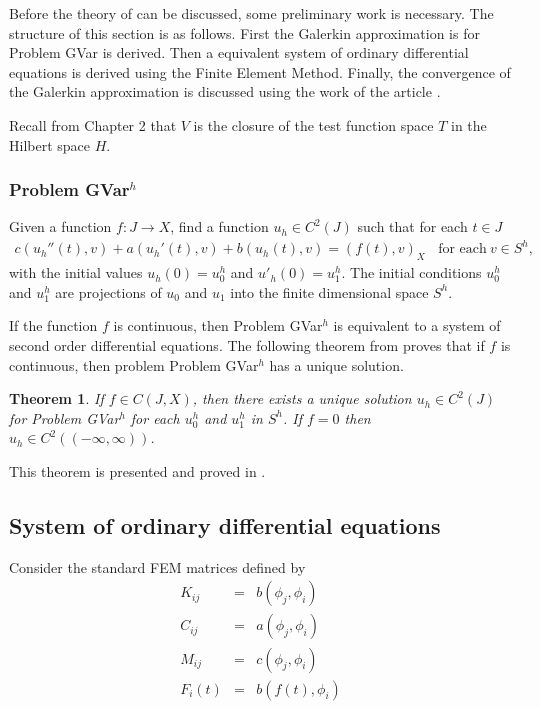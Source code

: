 \documentclass[../../main.tex]{subfiles}
\begin{document}
Before the theory of \cite{BV13} can be discussed, some preliminary work is
necessary. The structure of this section is as follows. First the Galerkin
approximation is for Problem GVar is derived. Then a equivalent system of
ordinary differential equations is derived using the Finite Element Method.
Finally, the convergence of the Galerkin approximation is discussed using the
work of the article \cite{BV13}.

Recall from Chapter 2 that $V$ is the closure of the test function space $T$ in
the Hilbert space $H$.

\subsubsection*{Problem GVar$^h$}
Given a function $f: J \rightarrow X$, find a function $u_h \in C^2(J)$ such that for each $t\in J$
\begin{eqnarray}
	c(u_h''(t),v)+a(u_h'(t),v)+b(u_h(t),v)= (f(t),v)_{X} \ \ \ \ \textrm{for each} \ v \in S^h, \label{DC_E2}
\end{eqnarray}
with the initial values $u_h(0)=u^h_{0}$ and $u'_h(0)=u^h_{1}$. The initial conditions $u^h_{0}$ and $u^h_{1}$ are projections of $u_0$ and $u_1$ into the finite dimensional space $S^h$.

If the function $f$ is continuous, then Problem GVar$^h$ is equivalent to a
system of second order differential equations. The following theorem from
\cite{BV13} proves that if $f$ is continuous, then problem Problem GVar$^h$ has
a unique solution.

\newtheorem{DC_Thm2}{Theorem}
\begin{DC_Thm2} \label{DC_THM2}
	If $f \in C(J,X)$, then there exists a unique solution $u_h \in C^2(J)$ for Problem GVar$^h$ for each $u_0^h$ and $u_1^h$ in $S^h$. If $f = 0$ then $u_h \in C^2((-\infty, \infty))$.
\end{DC_Thm2}

This theorem is presented and proved in \cite{BV13}.

\subsection{System of ordinary differential equations}
Consider the standard FEM matrices defined by
\begin{eqnarray*}
	K_{ij} & = & b(\phi_j, \phi_i)\\
	C_{ij} & = & a(\phi_j, \phi_i)\\
	M_{ij} & = & c(\phi_j, \phi_i)\\
	F_{i}(t) & = & b(f(t), \phi_i)
\end{eqnarray*}
\end{document}
